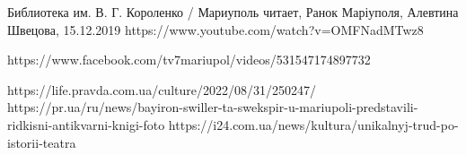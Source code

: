  
 
 
 
 

Библиотека им. В. Г. Короленко / Мариуполь читает, Ранок Маріуполя, Алевтина Швецова, 15.12.2019
https://www.youtube.com/watch?v=OMFNadMTwz8

https://www.facebook.com/tv7mariupol/videos/531547174897732

https://life.pravda.com.ua/culture/2022/08/31/250247/
https://pr.ua/ru/news/bayiron-swiller-ta-swekspir-u-mariupoli-predstavili-ridkisni-antikvarni-knigi-foto
https://i24.com.ua/news/kultura/unikalnyj-trud-po-istorii-teatra
